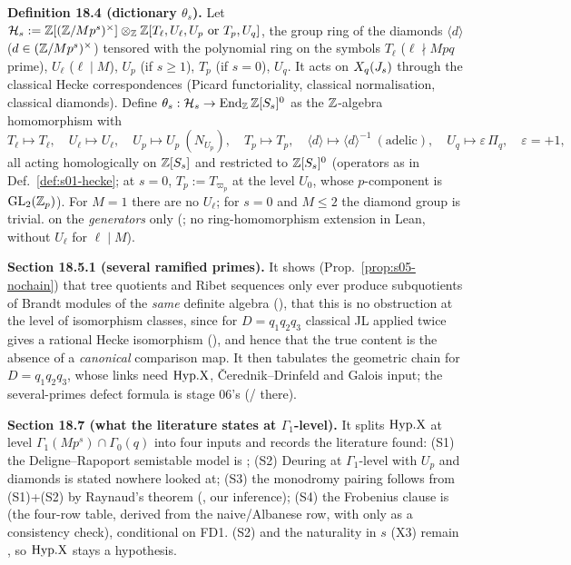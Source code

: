 \medskip
\noindent{}\label{rpt:def:s05-theta}\textbf{Definition 18.4 (dictionary $\theta_s$).}
Let $\mathcal{H}_s:=\mathbb{Z}[(\mathbb{Z}/Mp^s)^\times]\otimes_{\mathbb{Z}}\mathbb{Z}[T_\ell,U_\ell,U_p\text{ or }T_p,U_q]$, the group ring of the diamonds $\langle d\rangle$
($d\in(\mathbb{Z}/Mp^s)^\times$) tensored with the polynomial ring on the symbols
$T_\ell$ ($\ell\nmid Mpq$ prime), $U_\ell$ ($\ell\mid M$), $U_p$ (if $s\ge1$), $T_p$ (if $s=0$), $U_q$.
It acts on $X_q(J_s)$ through the classical Hecke correspondences (Picard functoriality, classical normalisation, classical
diamonds). Define $\theta_s:\mathcal{H}_s\to\operatorname{End}_{\mathbb{Z}}\mathbb{Z}[S_s]^0$ as the $\mathbb{Z}$-algebra homomorphism with
\[T_\ell\mapsto T_\ell,\quad U_\ell\mapsto U_\ell,\quad U_p\mapsto U_p\ (N_{U_p}),\quad T_p\mapsto T_p,\quad
\langle d\rangle\mapsto\langle d\rangle^{-1}\ (\text{adelic}),\quad U_q\mapsto\varepsilon\,\Pi_q,\quad \varepsilon=+1,\]
all acting homologically on $\mathbb{Z}[S_s]$ and restricted to $\mathbb{Z}[S_s]^0$ (operators as in Def.~\ref{def:s01-hecke}; at $s=0$,
$T_p:=T_{\varpi_p}$ at the level $U_0$, whose $p$-component is $\mathrm{GL}_2(\mathbb{Z}_p)$). For $M=1$ there are no $U_\ell$; for $s=0$ and $M\le2$ the
diamond group is trivial. \stformal{} on the \emph{generators} only (; no ring-homomorphism extension
in Lean, without $U_\ell$ for $\ell\mid M$).

\medskip
\noindent{}\label{rpt:sss:s05-general}\textbf{Section 18.5.1 (several ramified primes).}
It shows (Prop.~\ref{prop:s05-nochain}) that tree quotients and Ribet sequences only ever produce subquotients of Brandt modules of the
\emph{same} definite algebra (\stproved), that this is no obstruction at the level of isomorphism classes, since for $D=q_1q_2q_3$ classical
JL applied twice gives a rational Hecke isomorphism (\stpmc), and hence that the true content is the absence of a \emph{canonical}
comparison map. It then tabulates the geometric chain for $D=q_1q_2q_3$, whose links need $\mathrm{Hyp.X}$, \v{C}erednik--Drinfeld and Galois
input; the several-primes defect formula is stage 06's (\stconj{}/\stsketch{} there).

\medskip
\noindent{}\label{rpt:ss:s05-status}\textbf{Section 18.7 (what the literature states at $\Gamma_1$-level).}
It splits $\mathrm{Hyp.X}$ at level $\Gamma_1(Mp^s)\cap\Gamma_0(q)$ into four inputs and records the literature found: (S1) the
Deligne--Rapoport semistable model is \stcited{} \cite[Ch.~VI, Thm.~6.9]{DR}; (S2) Deuring at $\Gamma_1$-level with $U_p$ and diamonds is
stated nowhere looked at; (S3) the monodromy pairing follows from (S1)+(S2) by Raynaud's theorem (\stpmc, our inference); (S4) the Frobenius
clause is \stpmc{} (the four-row table, derived from the naive/Albanese row, with \cite[Lemma~3.17]{RS} only as a consistency check),
conditional on FD1. (S2) and the naturality in $s$ (X3) remain \stexp, so $\mathrm{Hyp.X}$ stays a hypothesis.

